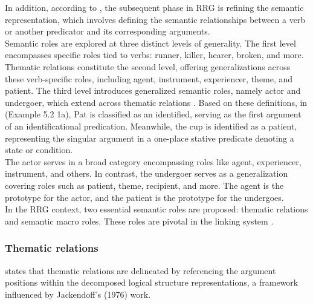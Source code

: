 In addition, according to \textcite{van2005exploring}, the subsequent phase in RRG is refining the semantic representation, which involves defining the semantic relationships between a verb or another predicator and its corresponding arguments.\\

Semantic roles are explored at three distinct levels of generality. The first level encompasses specific roles tied to verbs: runner, killer, hearer, broken, and more. Thematic relations constitute the second level, offering generalizations across these verb-specific roles, including agent, instrument, experiencer, theme, and patient. The third level introduces generalized semantic roles, namely actor and undergoer, which extend across thematic relations \parencite{van2005exploring}. Based on these definitions, in (Example 5.2 1a), Pat is classified as an identified, serving as the first argument of an identificational predication. Meanwhile, the cup is identified as a patient, representing the singular argument in a one-place stative predicate denoting a state or condition. \\

The actor serves in a broad category encompassing roles like agent, experiencer, instrument, and others. In contrast, the undergoer serves as a generalization covering roles such as patient, theme, recipient, and more. The agent is the prototype for the actor, and the patient is the prototype for the undergoes. \\

In the RRG context, two essential semantic roles are proposed: thematic relations and semantic macro roles. These roles are pivotal in the linking system \parencite{van2005exploring}.


\subsubsection{Thematic relations}


\textcite{van2005exploring} states that thematic relations are delineated by referencing the argument positions within the decomposed logical structure representations, a framework influenced by Jackendoff's (1976) work.


